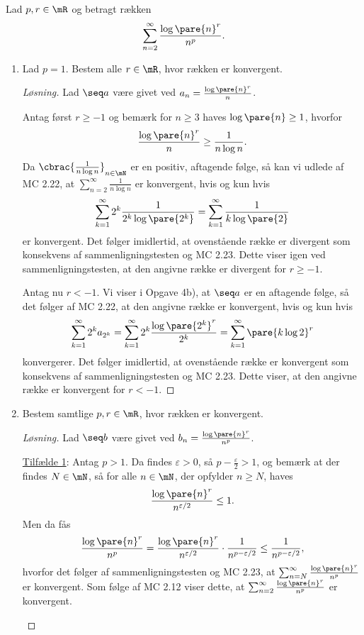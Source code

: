 \begin{opg}
Lad $p,r\in\mR$ og betragt rækken
$$ \sum_{n=2}^\infty \frac{\log\pare{n}^r}{n^p}. $$
\begin{enumerate}
    \item Lad $p = 1$. Bestem alle $r\in\mR$, hvor rækken er konvergent.
    
    \begin{proof}[Løsning]
    Lad $\seq a$ være givet ved $a_n = \frac{\log\pare{n}^r}{n}$. 
    
    Antag først $r\geq -1$ og bemærk for $n\geq 3$ haves $\log\pare{n}\geq 1$, hvorfor
    $$ \frac{\log\pare{n}^r}{n} \geq \frac{1}{n\log n}. $$
    Da $\cbrac{\frac{1}{n\log n}}_{n\in\mN}$ er en positiv, aftagende følge, så kan vi udlede af MC 2.22, at $\sum_{n=2}^\infty \frac{1}{n\log n}$ er konvergent, hvis og kun hvis
    $$ \sum_{k=1}^\infty 2^k \frac{1}{2^k\log\pare{2^k}}
        = \sum_{k=1}^\infty \frac{1}{k\log\pare{2}} $$
    er konvergent. Det følger imidlertid, at ovenstående række er divergent som konsekvens af sammenligningstesten og MC 2.23. Dette viser igen ved sammenligningstesten, at den angivne række er divergent for $r\geq -1$.
    
    Antag nu $r < -1$. Vi viser i Opgave 4b), at $\seq a$ er en aftagende følge, så det følger af MC 2.22, at den angivne række er konvergent, hvis og kun hvis 
    $$ \sum_{k=1}^\infty 2^ka_{2^k} = \sum_{k=1}^\infty 2^k\frac{\log\pare{2^k}^r}{2^k} = \sum_{k=1}^\infty \pare{k\log 2}^r $$
    konvergerer. Det følger imidlertid, at ovenstående række er konvergent som konsekvens af sammenligningstesten og MC 2.23. Dette viser, at den angivne række er konvergent for $r < -1$.
    \end{proof}
    
    \item Bestem samtlige $p,r\in\mR$, hvor rækken er konvergent.
    
    \begin{proof}[Løsning]
    Lad $\seq b$ være givet ved $b_n = \frac{\log\pare{n}^r}{n^p}$.
    
    \begin{indent}
    \underline{Tilfælde 1}: Antag $p > 1$. Da findes $\varepsilon>0$, så $p-\frac{\varepsilon}{2}>1$, og bemærk at der findes $N\in\mN$, så for alle $n\in\mN$, der opfylder $n\geq N$, haves
    $$ \frac{\log\pare{n}^r}{n^{\varepsilon/2}} \leq 1. $$
    Men da fås
    $$ \frac{\log\pare{n}^r}{n^p} = \frac{\log\pare{n}^r}{n^{\varepsilon/2}}\cdot\frac{1}{n^{p-\varepsilon/2}}
    \leq \frac{1}{n^{p-\varepsilon/2}}, $$
    hvorfor det følger af sammenligningstesten og MC 2.23, at $\sum_{n=N}^\infty \frac{\log\pare{n}^r}{n^p}$ er konvergent. Som følge af MC 2.12 viser dette, at $\sum_{n=2}^\infty \frac{\log\pare{n}^r}{n^p}$ er konvergent. \\
    

\end{indent}
\end{proof}
\end{enumerate}
\end{opg}
